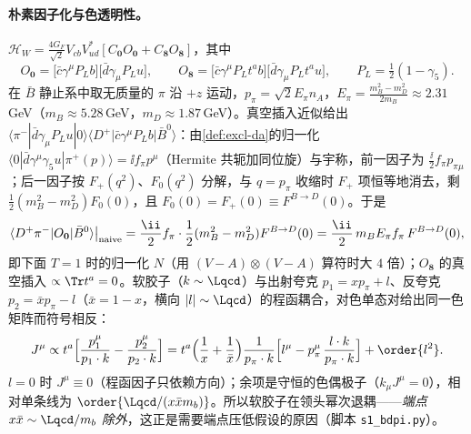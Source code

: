 \paragraph{朴素因子化与色透明性。}
$\mathcal H_W=\frac{4G_F}{\sqrt2}V_{cb}V_{ud}^*[C_{\mathbf 0}O_{\mathbf 0}+C_{\mathbf 8}O_{\mathbf 8}]$，其中\cite[式~(2)]{BauerPirjolStewart2001}
\begin{equation}\label{eq:heavy-O08}
O_{\mathbf 0}=\big[\bar c\gamma^\mu P_Lb\big]\big[\bar d\gamma_\mu P_Lu\big],\qquad
O_{\mathbf 8}=\big[\bar c\gamma^\mu P_Lt^ab\big]\big[\bar d\gamma_\mu P_Lt^au\big],\qquad P_L=\tfrac12(1-\gamma_5).
\end{equation}
在 $\bar B$ 静止系中取无质量的 $\pi$ 沿 $+z$ 运动，$p_\pi=\sqrt2E_\pi n_A$，$E_\pi=\frac{m_B^2-m_D^2}{2m_B}\approx2.31$\,GeV（$m_B\approx5.28$\,GeV，$m_D\approx1.87$\,GeV\cite{ParticleDataGroup:2024cfk}）。真空插入近似给出 $\langle\pi^-|\bar d\gamma_\mu P_Lu|0\rangle\langle D^+|\bar c\gamma^\mu P_Lb|\bar B^0\rangle$：由\cref{def:excl-da}的归一化 $\langle0|\bar d\gamma^\mu\gamma_5u|\pi^+(p)\rangle=\ii f_\pi p^\mu$（Hermite 共轭加同位旋）与宇称，前一因子为 $\frac{\ii}{2}f_\pi p_{\pi\mu}$；后一因子按 $F_+(q^2)$、$F_0(q^2)$ 分解，与 $q=p_\pi$ 收缩时 $F_+$ 项恒等地消去，剩 $\frac12(m_B^2-m_D^2)F_0(0)$，且 $F_0(0)=F_+(0)\equiv F^{B\to D}(0)$。于是
\begin{equation}\label{eq:heavy-naive}
\langle D^+\pi^-|O_{\mathbf 0}|\bar B^0\rangle\big|_{\rm naive}=\frac{\ii}{2}f_\pi\cdot\frac12(m_B^2-m_D^2)F^{B\to D}(0)=\frac{\ii}{2}\,m_BE_\pi f_\pi\,F^{B\to D}(0),
\end{equation}
即下面 $T=1$ 时的归一化 $N$（用 $(V-A)\otimes(V-A)$ 算符时大 $4$ 倍）；$O_{\mathbf 8}$ 的真空插入 $\propto\Tr t^a=0$。软胶子（$k\sim\Lqcd$）与出射夸克 $p_1=xp_\pi+l$、反夸克 $p_2=\bar xp_\pi-l$（$\bar x=1-x$，横向 $|l|\sim\Lqcd$）的程函耦合，对色单态对给出同一色矩阵而符号相反：
\begin{equation}\label{eq:heavy-dipole}
J^\mu\propto t^a\Big[\frac{p_1^\mu}{p_1\cdot k}-\frac{p_2^\mu}{p_2\cdot k}\Big]
=t^a\Big(\frac1x+\frac1{\bar x}\Big)\frac{1}{p_\pi\cdot k}\Big[l^\mu-p_\pi^\mu\,\frac{l\cdot k}{p_\pi\cdot k}\Big]+\order{l^2}.
\end{equation}
$l=0$ 时 $J^\mu\equiv0$（程函因子只依赖方向）；余项是守恒的色偶极子（$k_\mu J^\mu=0$），相对单条线为 $\order{\Lqcd/(x\bar xm_b)}$。所以软胶子在领头幂次退耦——\emph{端点 $x\bar x\sim\Lqcd/m_b$ 除外}，这正是需要端点压低假设的原因（脚本 \texttt{s1\_\allowbreak bdpi.py}）。


